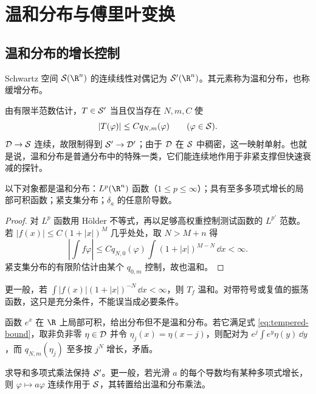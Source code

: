 \chapter{温和分布与傅里叶变换}\label{ch:fourier}

\section{温和分布的增长控制}
\begin{definition}[温和分布]
Schwartz 空间 $\Sch(\R^n)$ 的连续线性对偶记为 $\Temp(\R^n)$。其元素称为温和分布，也称缓增分布。
\end{definition}
由有限半范数估计，$T\in\mathcal{S}'$ 当且仅当存在 $N,m,C$ 使
\begin{equation}\label{eq:tempered-bound}
 |T(\varphi)|\le Cq_{N,m}(\varphi)\qquad(\varphi\in\mathcal{S}).
\end{equation}
$\mathcal{D}\to\mathcal{S}$ 连续，故限制得到 $\mathcal{S}'\to\mathcal{D}'$；由于 $\mathcal{D}$ 在 $\mathcal{S}$ 中稠密，这一映射单射。也就是说，温和分布是普通分布中的特殊一类，它们能连续地作用于非紧支撑但快速衰减的探针。

\begin{proposition}[基本例子]
以下对象都是温和分布：$L^p(\R^n)$ 函数（$1\le p\le\infty$）；具有至多多项式增长的局部可积函数；紧支集分布；$\delta_a$ 的任意阶导数。
\end{proposition}
\begin{proof}
对 $L^p$ 函数用 Hölder 不等式，再以足够高权重控制测试函数的 $L^{p'}$ 范数。若 $|f(x)|\le C(1+|x|)^M$ 几乎处处，取 $N>M+n$ 得
\[
 |\int f\varphi|\le Cq_{N,0}(\varphi)
 \int(1+|x|)^{M-N}\,\dd x<\infty.
\]
紧支集分布的有限阶估计由某个 $q_{0,m}$ 控制，故也温和。
\end{proof}
更一般，若 $\int|f(x)|(1+|x|)^{-N}\,\dd x<\infty$，则 $T_f$ 温和。对带符号或复值的振荡函数，这只是充分条件，不能误当成必要条件。

\begin{example}[普通分布并非都温和]
函数 $e^x$ 在 $\R$ 上局部可积，给出分布但不是温和分布。若它满足式 \eqref{eq:tempered-bound}，取非负非零 $\eta\in\mathcal{D}$ 并令 $\eta_j(x)=\eta(x-j)$，则配对为 $e^j\int e^y\eta(y)\,\dd y$，而 $q_{N,m}(\eta_j)$ 至多按 $j^N$ 增长，矛盾。
\end{example}
求导和多项式乘法保持 $\mathcal{S}'$。更一般，若光滑 $a$ 的每个导数均有某种多项式增长，则 $\varphi\mapsto a\varphi$ 连续作用于 $\mathcal{S}$，其转置给出温和分布乘法。

